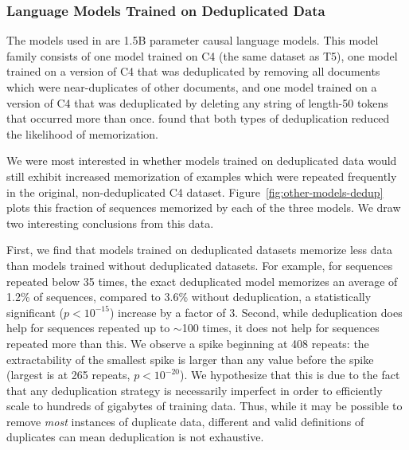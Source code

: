 \subsubsection{Language Models Trained on Deduplicated Data}

The models used in \citet{lee2021deduplicating} are 1.5B parameter causal language models.
This model family consists of one model trained on C4 (the same dataset as T5), one model trained on a version of C4 that was deduplicated by removing all documents which were near-duplicates of other documents, and one model trained on a version of C4 that was deduplicated by deleting any string of length-50 tokens that occurred more than once.
\citet{lee2021deduplicating} found that both types of deduplication reduced the likelihood of memorization.

We were most interested in whether models trained on deduplicated data would still exhibit increased memorization of examples which were repeated frequently in the original, non-deduplicated C4 dataset.
%
Figure~\ref{fig:other-models-dedup} plots this fraction of sequences memorized by each of the three models.
%
We draw two interesting conclusions from this data.


First, we find that models trained on deduplicated datasets memorize less data than models trained without deduplicated datasets.
%
For example, for sequences repeated below 35 times, the exact deduplicated model memorizes an average of 1.2\% of sequences, compared to 3.6\% without deduplication, a statistically significant ($p<10^{-15}$) increase by a factor of 3. 
Second, while deduplication does help for sequences repeated up to $\sim$100 times,
it does not help for sequences repeated more than this.
%
We observe a spike beginning at 408 repeats: the extractability of the smallest spike is larger than any value before the spike (largest is at 265 repeats, $p<10^{-20}$).
%
We hypothesize that this is due to the fact that any deduplication strategy is necessarily
imperfect in order to efficiently scale to hundreds of gigabytes of training data.
%
Thus, while it may be possible to remove \emph{most} instances of duplicate data, different and valid definitions of duplicates can mean deduplication is not exhaustive.


